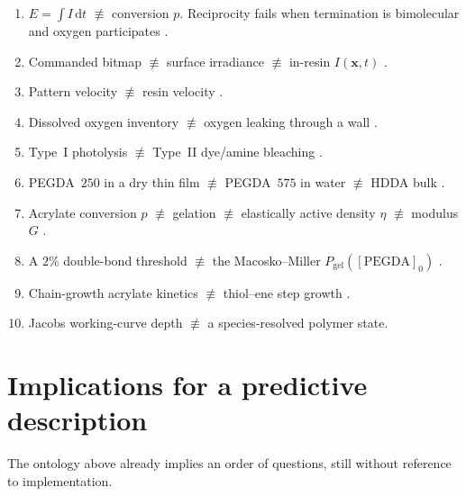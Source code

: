 \documentclass[11pt,a4paper]{article}
\begin{document}
\begin{enumerate}
  \item $E=\int I\,\mathrm{d}t$ $\not\equiv$ conversion $p$. Reciprocity fails when termination is bimolecular and oxygen participates \citep{Wydra2014,Lin2019}.
  \item Commanded bitmap $\not\equiv$ surface irradiance $\not\equiv$ in-resin $I(\mathbf{x},t)$ \citep{Meenakshisundaram2020,Montgomery2022}.
  \item Pattern velocity $\not\equiv$ resin velocity \citep{Meenakshisundaram2020,Slutzky2019}.
  \item Dissolved oxygen inventory $\not\equiv$ oxygen leaking through a wall \citep{Slutzky2019,Dendukuri2008}.
  \item Type~I photolysis $\not\equiv$ Type~II dye/amine bleaching \citep{Dadashi2016,Zhu2020,Montgomery2022}.
  \item PEGDA~$250$ in a dry thin film $\not\equiv$ PEGDA~$575$ in water $\not\equiv$ HDDA bulk \citep{Montgomery2022,Zhu2020,Dobson2024}.
  \item Acrylate conversion $p$ $\not\equiv$ gelation $\not\equiv$ elastically active density $\eta$ $\not\equiv$ modulus $G$ \citep{Zhu2020,Flory1941,Zhong2016}.
  \item A $2\%$ double-bond threshold \citep{Slutzky2019} $\not\equiv$ the Macosko--Miller $P_{\mathrm{gel}}([\mathrm{PEGDA}]_0)$ \citep{Zhu2020}.
  \item Chain-growth acrylate kinetics $\not\equiv$ thiol--ene step growth \citep{Cramer2001}.
  \item Jacobs working-curve depth \citep{Jacobs1992book} $\not\equiv$ a species-resolved polymer state.
\end{enumerate}

\section{Implications for a predictive description}

The ontology above already implies an order of questions, still without reference to implementation.
\end{document}
